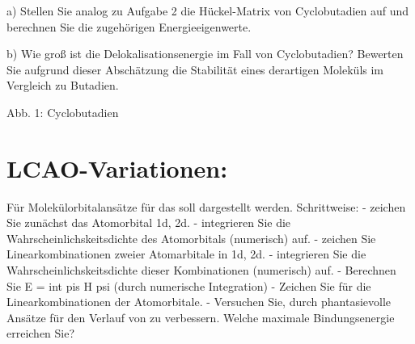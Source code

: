 
 a) Stellen Sie analog zu Aufgabe 2 die Hückel-Matrix von Cyclobutadien auf und berechnen Sie die zugehörigen Energieeigenwerte.
 
b) Wie groß ist die Delokalisationsenergie im Fall von Cyclobutadien? Bewerten Sie aufgrund dieser Abschätzung die Stabilität eines derartigen Moleküls im Vergleich zu Butadien.

Abb. 1: Cyclobutadien
 
\section{LCAO-Variationen:}

Für Molekülorbitalansätze   für das   soll  dargestellt werden.
Schrittweise:
- zeichen Sie zunächst das Atomorbital 1d, 2d. 
- integrieren Sie die Wahrscheinlichskeitsdichte des Atomorbitals (numerisch) auf.
- zeichen Sie Linearkombinationen zweier Atomarbitale in 1d, 2d.
- integrieren Sie die Wahrscheinlichskeitsdichte dieser Kombinationen (numerisch) auf.
- Berechnen Sie E = int pis H psi (durch numerische Integration)
- Zeichen Sie  für die Linearkombinationen der Atomorbitale.
- Versuchen Sie, durch phantasievolle Ansätze für   den Verlauf von  zu verbessern.
	  Welche maximale Bindungsenergie erreichen Sie?
